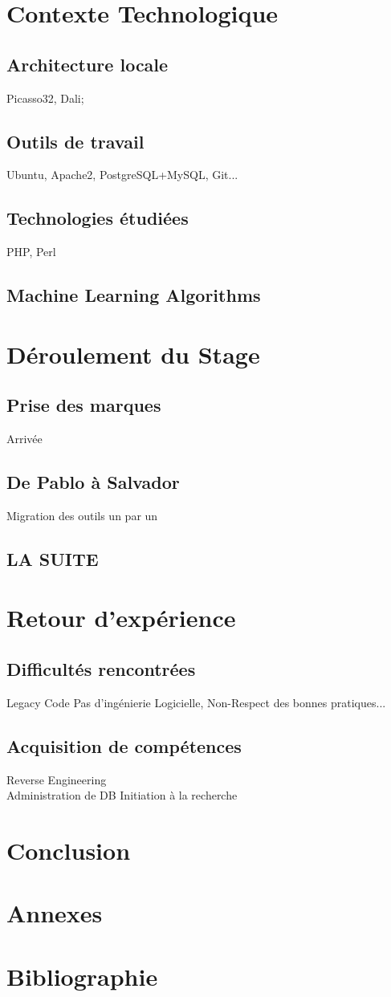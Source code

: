 \documentclass[12pt]{article}
\begin{document}
\section{Contexte Technologique}
\subsection{Architecture locale}
Picasso32, Dali;
\subsection{Outils de travail}
Ubuntu, Apache2, PostgreSQL+MySQL, Git...
\subsection{Technologies étudiées}
PHP, Perl
\subsection{Machine Learning Algorithms}
\section{Déroulement du Stage}
\subsection{Prise des marques}
Arrivée
\subsection{De Pablo à Salvador}
Migration des outils un par un
\subsection{LA SUITE}
\section{Retour d'expérience}
\subsection{Difficultés rencontrées}
Legacy Code
Pas d'ingénierie Logicielle, Non-Respect des bonnes pratiques...
\subsection{Acquisition de compétences}
Reverse Engineering\\
Administration de DB
Initiation à la recherche
\section*{Conclusion}
\section*{Annexes}
\section*{Bibliographie}
\end{document}
